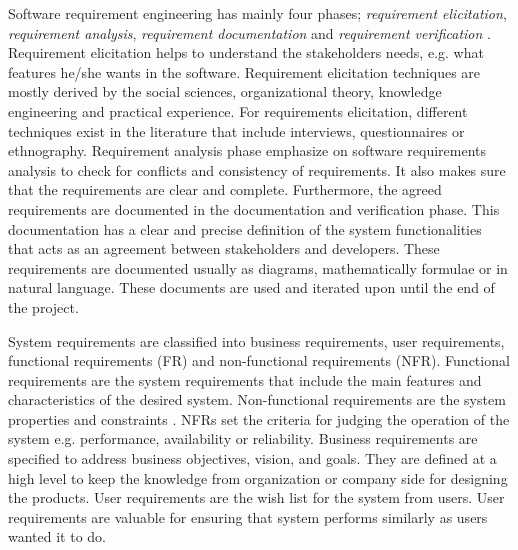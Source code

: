 Software requirement engineering has mainly four phases; \emph{requirement
elicitation}, \emph{requirement analysis}, \emph{requirement documentation} and
\emph{requirement verification} \cite {Kotonya:1998}. Requirement elicitation
\cite{Coughlan:2002, Zowghi2005} helps to understand the
stakeholders needs, e.g. what features he/she wants in the software.
Requirement elicitation techniques are mostly derived by the social sciences,
organizational theory, knowledge engineering and practical experience. For
requirements elicitation, different techniques exist in the literature that
include interviews, questionnaires or ethnography.
Requirement analysis \cite{Nuseibeh:2000} phase emphasize on software requirements analysis 
to check for conflicts and consistency of requirements. It also makes sure
that the requirements are clear and complete.
Furthermore, the agreed requirements are documented in the documentation and verification phase. This documentation has a clear and precise
definition of the system functionalities that acts as an agreement between
stakeholders and developers. These requirements are documented usually as diagrams, mathematically
formulae or in natural language. These documents are used and iterated upon
until the end of the project.

System requirements are classified into business requirements, user
requirements, functional requirements (FR) and non-functional requirements (NFR). Functional
requirements are the system requirements that include the main features and
characteristics of the desired system. Non-functional requirements are the
system properties and constraints \cite{Davis:1993, Glinz}. NFRs set the
criteria for judging the operation of the system e.g.
performance, availability or reliability. Business requirements are specified to
address business objectives, vision, and goals. They are defined at a high level
to keep the knowledge from organization or company side for designing the products.
User requirements are the wish list for the system from users.
User requirements are valuable for ensuring that system performs similarly as users wanted it to do.
